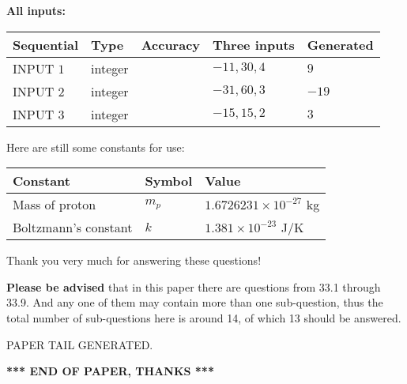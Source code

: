 \documentclass[12pt]{article}
\begin{document}
   
   
   
\noindent\vspace{0.1in}\hspace{-0.08in} {\textbf{\Large{All inputs: }}}
   
   
  
  
\noindent\begin{tabular}{|l|l|l|l|l|}
\hline
 Sequential & Type & Accuracy & Three inputs & Generated \\ 
\hline
 
 
  INPUT $           1$ & integer &  & $
 -11
 , 
 30
 , 
 4
 $ & $ 9 $ 
 \\  \hline  
 
 
  INPUT $           2$ & integer &  & $
 -31
 , 
 60
 , 
 3
 $ & $ -19 $ 
 \\  \hline  
 
 
  INPUT $           3$ & integer &  & $
 -15
 , 
 15
 , 
 2
 $ & $ 3 $ 
 \\  \hline  
 \end{tabular}
   
   
   
   
   
   
 \vspace{0.2in}
Here are still some constants for use:
 
 
\noindent\begin{tabular}{|l|l|l|}
\hline
Constant & Symbol & Value \\
\hline
 
Mass of proton &
$m_p$ &
 $ 1.6726231 \times 10^{-27} $
kg \\
\hline
 
Boltzmann's constant &
$k$ &
 $ 1.381 \times 10^{-23} $
J/K \\
\hline
 
\end{tabular}
 
Thank you very much for answering these questions!
 
{\textbf{\large{Please be advised}}} that in this paper there are questions from
33.1 through
33.9.
And any one of them may contain more than one sub-question, thus the total number
of sub-questions here is around 14, of which
13 should be answered.
 
   
   
\vspace{2.0in} PAPER TAIL GENERATED.
   
   
   
   
\vspace{1.0in} 
{\textbf{\large{ *** END OF PAPER, THANKS *** }}} 
   
\end{document}
